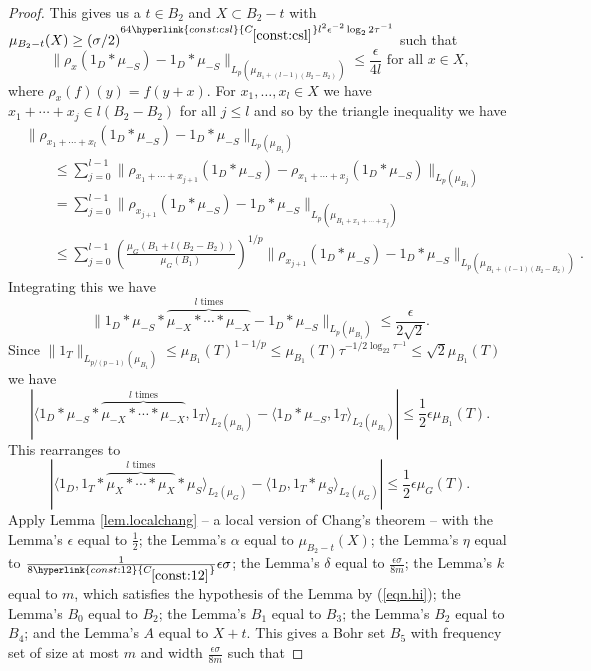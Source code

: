 \documentclass[12pt,reqno]{amsart}
\numberwithin{equation}{section}
\newcommand{\refconstbig}[1]{%
    \hyperlink{const:#1}{C_{\ref{const:#1}}}%
}
\begin{document}
\begin{proof}
This gives us a $t \in B_2$ and $X \subset B_2-t$ with $\mu_{B_2-t}(X) \geq (\sigma/2)^{64\refconstbig{csl}l^2\epsilon^{-2}\log_2 2\tau^{-1}}$ such that
\begin{equation*}
\|\rho_{x}(1_D \ast \mu_{-S} ) - 1_D \ast \mu_{-S} \|_{L_p(\mu_{B_1+(l-1)(B_2-B_2)})} \leq \frac{\epsilon}{4l} \text{ for all } x \in X,
\end{equation*}
where $\rho_x(f)(y)=f(y+x)$. For $x_1,\dots,x_l \in X$ we have $x_1+\cdots + x_j \in l(B_2-B_2)$ for all $j \leq l$ and so by the triangle inequality we have
\begin{align*}
& \|\rho_{x_1+\cdots + x_l}(1_D \ast \mu_{-S} ) - 1_D \ast \mu_{-S} \|_{L_p(\mu_{B_1})}\\ &\qquad\leq \sum_{j=0}^{l-1}{ \|\rho_{x_1+\cdots + x_{j+1}}(1_D \ast \mu_{-S} ) - \rho_{x_1+\cdots + x_{j}}(1_D \ast \mu_{-S}) \|_{L_p(\mu_{B_1})}}\\ &\qquad= \sum_{j=0}^{l-1}{ \|\rho_{x_{j+1}}(1_D \ast \mu_{-S} ) - 1_D \ast \mu_{-S} \|_{L_p(\mu_{B_1+x_1+\cdots + x_j})}}\\&\qquad\leq \sum_{j=0}^{l-1}{\left(\frac{\mu_G(B_1+l(B_2-B_2))}{\mu_G(B_1)}\right)^{1/p} \|\rho_{x_{j+1}}(1_D \ast \mu_{-S} ) - 1_D \ast \mu_{-S} \|_{L_p(\mu_{B_1+(l-1)(B_2-B_2)})}}.
\end{align*}
Integrating this we have
\begin{equation*}
\|1_D \ast \mu_{-S} \ast \overbrace{\mu_{-X} \ast \cdots \ast \mu_{-X}}^{l \text{ times}} - 1_D \ast \mu_{-S} \|_{L_p(\mu_{B_1})} \leq \frac{\epsilon}{2\sqrt{2}}.
\end{equation*}
Since $\|1_T\|_{L_{p/(p-1)}(\mu_{B_1})} \leq \mu_{B_1}(T)^{1-1/p} \leq \mu_{B_1}(T)\tau^{-1/2\log_22\tau^{-1}}\leq \sqrt{2}\mu_{B_1}(T)$ we have
\begin{equation*}
|\langle 1_{D}\ast \mu_{-S}\ast \overbrace{\mu_{-X} \ast \cdots \ast \mu_{-X}}^{l \text{ times}}  , 1_T\rangle_{L_2(\mu_{B_1})} - \langle 1_D\ast \mu_{-S},1_T\rangle_{L_2(\mu_{B_1})}| \leq \frac{1}{2}\epsilon \mu_{B_1}(T).
\end{equation*}
This rearranges to
\begin{equation}\label{eqn.ab}
|\langle 1_{D}, 1_T \ast \overbrace{\mu_X\ast \cdots \ast \mu_X}^{l \text{ times}}\ast \mu_S\rangle_{L_2(\mu_G)} - \langle 1_D,  1_T\ast \mu_S\rangle_{L_2(\mu_G)} | \leq \frac{1}{2}\epsilon \mu_{G}(T).
\end{equation}
Apply Lemma \ref{lem.localchang} -- a local version of Chang's theorem -- with the Lemma's $\epsilon$ equal to $\frac{1}{2}$; the Lemma's $\alpha$ equal to $\mu_{B_2-t}(X)$; the Lemma's $\eta$ equal to $\frac{1}{8\refconstbig{12}}\epsilon\sigma$; the Lemma's $\delta$ equal to $\frac{\epsilon\sigma}{8m}$; the Lemma's $k$ equal to $m$, which satisfies the hypothesis of the Lemma by (\ref{eqn.hi}); the Lemma's ${B_0}$ equal to $B_2$; the Lemma's $B_1$ equal to $B_3$; the Lemma's $B_2$ equal to $B_4$; and the Lemma's $A$ equal to $X+t$. This gives a Bohr set $B_5$ with frequency set of size at most $m$ and width $\frac{\epsilon \sigma}{8m}$ such that

\end{proof}
\end{document}
